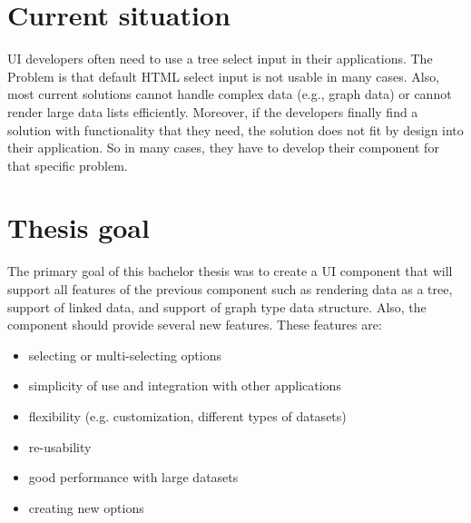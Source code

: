
\section{Current situation}

UI developers often need to use a tree select input in their applications. The Problem is that default HTML select input is not usable in many cases. Also, most current solutions cannot handle complex data (e.g., graph data) or cannot render large data lists efficiently. Moreover, if the developers finally find a solution with functionality that they need, the solution does not fit by design into their application. So in many cases, they have to develop their component for that specific problem.



\section{Thesis goal}

The primary goal of this bachelor thesis was to create a UI component that will support all features of the previous component such as rendering data as a tree, support of linked data, and support of graph type data structure. Also, the component should provide several new features. These features are:
\begin{itemize}
\item selecting or multi-selecting options
\item simplicity of use and integration with other applications
\item flexibility (e.g. customization, different types of datasets)
\item re-usability
\item good performance with large datasets
\item creating new options
\end{itemize}



